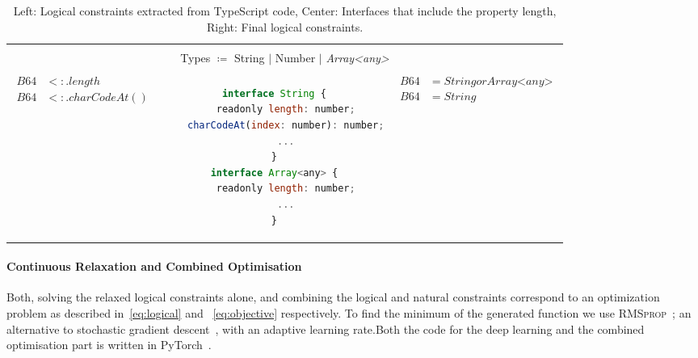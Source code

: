 \documentclass[acmsmall, review, anonymous]{acmart}\settopmatter{printfolios=true,printccs=false,printacmref=false}
\begin{document}
\begin{table*}[t]
    \centering
    \caption{Left: Logical constraints extracted from TypeScript code,
    Center: Interfaces that include the property length,
    Right: Final logical constraints.}\label{fig:log-base64a}
    \begin{tabular}{ccc}
        \toprule\\
        \multicolumn{3}{c}{Types $\coloneqq$ String $\mathbin{|}$ Number $\mathbin{|}$ \textit{Array<any>}}\\
        \midrule\\
        \begin{minipage}{0.25\textwidth}
            {\begin{align*}
                B64 & <: .length\\
                B64 & <: .charCodeAt()
            \end{align*}}
        \end{minipage} &
        \begin{minipage}{0.35\textwidth}
{\begin{lstlisting}[language=JavaScript,numbers=none]
interface String {
    readonly length: number;
    charCodeAt(index: number): number;
    ...
}
interface Array<any> {
    readonly length: number;
    ...
}
\end{lstlisting}}
        \end{minipage} &
        \begin{minipage}{0.3\textwidth}
            {\begin{align*}
                B64 & = String \mathbin{or} \textit{Array<any>}\\
                B64 & = String
            \end{align*}}
        \end{minipage}\\
        \bottomrule
    \end{tabular}
\end{table*}
\paragraph{ Continuous Relaxation and Combined Optimisation} 
Both, solving the relaxed logical constraints alone, and combining the logical and natural constraints correspond to an optimization 
problem as described in~\eqref{eq:logical} and
~\eqref{eq:objective} respectively. To find the minimum of the generated function we use 
\textsc{RMSprop}~\cite{tieleman2014};
an alternative to stochastic gradient descent~\cite{robbins51}, with an adaptive learning rate.Both the code for the deep
learning and the combined optimisation part is written in
PyTorch~\cite{paszke2017}.
\end{document}
